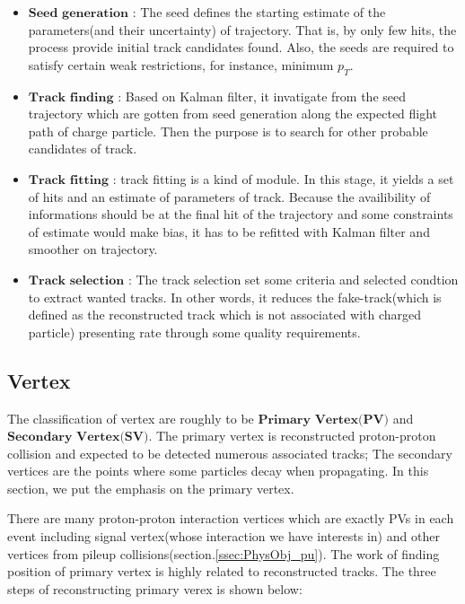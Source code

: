 		\begin{itemize}
			\item $\textbf{Seed generation}$ : The seed defines the starting estimate of the parameters(and their uncertainty) of trajectory. That is, by only few hits, the process provide initial track candidates found. Also, the seeds are required to satisfy certain weak restrictions, for instance, minimum $p_T$.
			\item $\textbf{Track finding}$ : Based on Kalman filter, it invatigate from the seed trajectory which are gotten from seed generation along the expected flight path of charge particle. Then the purpose is to search for other probable candidates of track.
			\item $\textbf{Track fitting}$ : track fitting is a kind of module. In this stage, it yields a set of hits and an estimate of parameters of track. Because the availibility of informations should be at the final hit of the trajectory and some constraints of estimate would make bias, it has to be refitted with Kalman filter and smoother on trajectory.
			\item $\textbf{Track selection}$ : The track selection set some criteria and selected condtion to extract wanted tracks. In other words, it reduces the fake-track(which is defined as the reconstructed track which is not associated with charged particle) presenting rate through some quality requirements.
		\label{PhysObj:itm:track_reco}
		\end{itemize}

	\subsection{Vertex}
	\label{ssec:PhysObj_vertex}

		The classification of vertex are roughly to be $\textbf{Primary}$ $\textbf{Vertex(PV)}$ and $\textbf{Secondary}$ $\textbf{Vertex(SV)}$. The primary vertex is reconstructed proton-proton collision and expected to be detected numerous associated tracks; The secondary vertices are the points where some particles decay when propagating. In this section, we put the emphasis on the primary vertex.

		There are many proton-proton interaction vertices which are exactly PVs in each event including signal vertex(whose interaction we have interests in) and other vertices from pileup collisions(section.\ref{ssec:PhysObj_pu}). The work of finding position of primary vertex is highly related to reconstructed tracks. The three steps of reconstructing primary verex is shown below:

